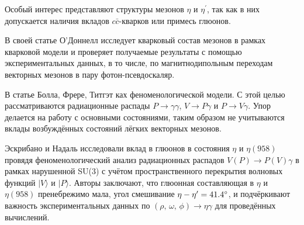 
Особый интерес представляют структуры мезонов $\eta$ и $\eta^\prime$, так как в них допускается наличия вкладов $c\bar{c}$-кварков или примесь глюонов. 

В своей статье О'Доннелл \cite{ODonnell:1981sj} исследует кварковый состав мезонов в
рамках кварковой модели и проверяет получаемые результаты с помощью
экспериментальных данных, в то числе, по магнитнодипольным переходам
векторных мезонов в пару фотон-псевдоскаляр.

В статье Болла, Фрере, Титгэт \cite{Ball:1995zv} ках феноменологической модели.%
С этой целью рассматриваются радиационные распады
$P \to \gamma \gamma$, $V \to P \gamma$ и $P \to V \gamma$. Упор
делается на работу с основными состояниями, таким образом не учитываются
вклады возбуждённых состояний лёгких векторных мезонов.

Эскрибано и Надаль \cite{Escribano:2007cd} исследовали вклад в глюонов в состояния $\eta$
и $\eta(958)$ провядя феноменологический анализ радиационных распадов
$V (P) \to P (V) \gamma$ в рамках нарушенной SU(3) с учётом
пространственного перекрытия волновых функций $| V \rangle$ и
$|P \rangle$. Авторы заключают, что глюонная составляющая в $\eta$ и
$\eta(958)$ пренебрежимо мала, угол смешивание
$\eta-\eta^\prime = \ang{41.4 \pm 1.3}$, и подчёркивают важность
экспериментальных данных по $(\rho, \, \omega, \, \phi ) \to \eta \gamma$ для
проведённых вычислений.


